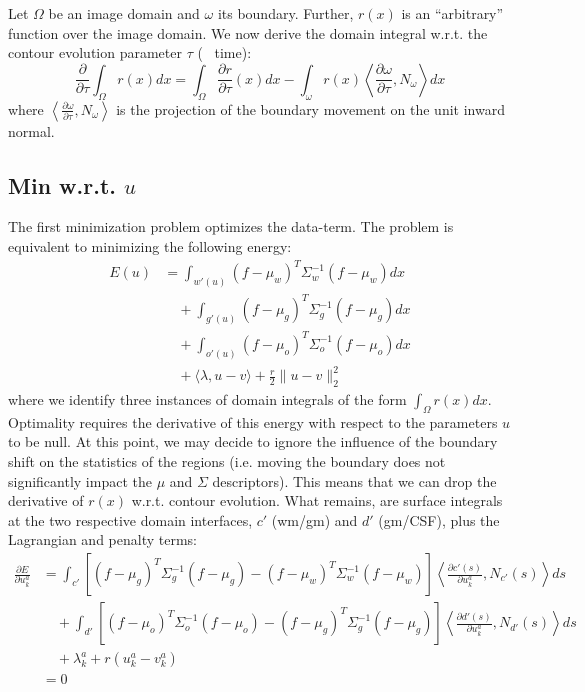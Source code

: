 \documentclass[a4paper,12pt]{article}
\begin{document}
Let $\Omega$ be an image domain and $\omega$ its boundary. Further, $r(x)$ is an ``arbitrary'' function over the image domain. We now derive the domain integral w.r.t. the contour evolution parameter $\tau$ (~ time):
\begin{equation}
\frac{\partial}{\partial \tau} \int_\Omega r(x) dx = \int_\Omega \frac{\partial r}{\partial \tau}(x) dx - \int_\omega r(x) \left\langle \frac{\partial\omega}{\partial\tau}, N_\omega\right\rangle dx
\end{equation}
where $\left\langle\frac{\partial\omega}{\partial\tau}, N_\omega\right\rangle$ is the projection of the boundary movement on the unit inward normal.


\subsection{Min w.r.t. $u$}
The first minimization problem optimizes the data-term. The problem is equivalent to minimizing the following energy:
\begin{align}
E(u) &= \int_{w'(u)} (f-\mu_w)^T\Sigma_w^{-1}(f-\mu_w) dx\nonumber\\
&\quad +\int_{g'(u)} (f-\mu_g)^T\Sigma_g^{-1}(f-\mu_g) dx\\
&\quad +\int_{o'(u)} (f-\mu_o)^T\Sigma_o^{-1}(f-\mu_o) dx\nonumber\\
&\quad + \langle \lambda, u-v \rangle + \frac{r}{2} \| u - v \|_2^2\nonumber
\end{align}
where we identify three instances of domain integrals of the form $\int_\Omega r(x) dx$. Optimality requires the derivative of this energy with respect to the parameters $u$ to be null. At this point, we may decide to ignore the influence of the boundary shift on the statistics of the regions (i.e. moving the boundary does not significantly impact the $\mu$ and $\Sigma$ descriptors). This means that we can drop the derivative of $r(x)$ w.r.t. contour evolution. What remains, are surface integrals at the two respective domain interfaces, $c'$ (wm/gm) and $d'$ (gm/CSF), plus the Lagrangian and penalty terms:
\begin{align}
\frac{\partial E}{\partial u_k^a} &= \int_{c'} \left[(f-\mu_g)^T\Sigma_g^{-1}(f-\mu_g) - (f-\mu_w)^T\Sigma_w^{-1}(f-\mu_w)\right]\left\langle\frac{\partial c'(s)}{\partial u_k^a}, N_{c'}(s)\right\rangle ds \nonumber\\
&\quad + \int_{d'} \left[(f-\mu_o)^T\Sigma_o^{-1}(f-\mu_o) - (f-\mu_g)^T\Sigma_g^{-1}(f-\mu_g)\right]\left\langle\frac{\partial d'(s)}{\partial u_k^a}, N_{d'}(s)\right\rangle ds \\
&\quad + \lambda_k^a + r(u_k^a - v_k^a)\nonumber\\
& = 0\nonumber
\end{align}
\end{document}
